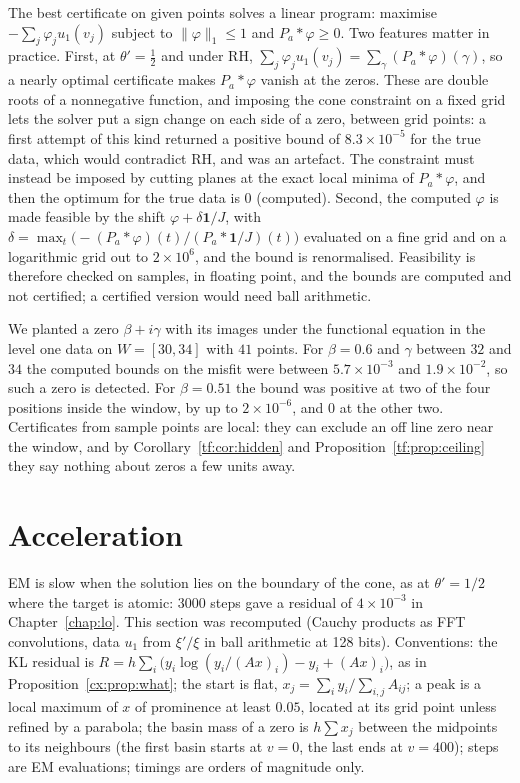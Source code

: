 The best certificate on given points solves a linear program: maximise $-\sum_j\varphi_ju_1(v_j)$ subject to $\|\varphi\|_1\le1$ and $P_a*\varphi\ge0$. Two features matter in practice. First, at $\theta'=\tfrac12$ and under RH, $\sum_j\varphi_ju_1(v_j)=\sum_\gamma(P_a*\varphi)(\gamma)$, so a nearly optimal certificate makes $P_a*\varphi$ vanish at the zeros. These are double roots of a nonnegative function, and imposing the cone constraint on a fixed grid lets the solver put a sign change on each side of a zero, between grid points: a first attempt of this kind returned a positive bound of $8.3\times10^{-5}$ for the true data, which would contradict RH, and was an artefact. The constraint must instead be imposed by cutting planes at the exact local minima of $P_a*\varphi$, and then the optimum for the true data is $0$ (computed). Second, the computed $\varphi$ is made feasible by the shift $\varphi+\delta\mathbf 1/J$, with $\delta=\max_t\bigl(-(P_a*\varphi)(t)/(P_a*\mathbf 1/J)(t)\bigr)$ evaluated on a fine grid and on a logarithmic grid out to $2\times10^6$, and the bound is renormalised. Feasibility is therefore checked on samples, in floating point, and the bounds are computed and not certified; a certified version would need ball arithmetic.

We planted a zero $\beta+i\gamma$ with its images under the functional equation in the level one data on $W=[30,34]$ with $41$ points. For $\beta=0.6$ and $\gamma$ between $32$ and $34$ the computed bounds on the misfit were between $5.7\times10^{-3}$ and $1.9\times10^{-2}$, so such a zero is detected. For $\beta=0.51$ the bound was positive at two of the four positions inside the window, by up to $2\times10^{-6}$, and $0$ at the other two. Certificates from sample points are local: they can exclude an off line zero near the window, and by Corollary~\ref{tf:cor:hidden} and Proposition~\ref{tf:prop:ceiling} they say nothing about zeros a few units away.

\section{Acceleration}\label{cx:sec:accel}

EM is slow when the solution lies on the boundary of the cone, as at $\theta'=1/2$ where the target is atomic: $3000$ steps gave a residual of $4\times10^{-3}$ in Chapter~\ref{chap:lo}. This section was recomputed (Cauchy products as FFT convolutions, data $u_1$ from $\xi'/\xi$ in ball arithmetic at 128 bits). Conventions: the KL residual is $R=h\sum_i\bigl(y_i\log(y_i/(Ax)_i)-y_i+(Ax)_i\bigr)$, as in Proposition~\ref{cx:prop:what}; the start is flat, $x_j=\sum_iy_i/\sum_{i,j}A_{ij}$; a peak is a local maximum of $x$ of prominence at least $0.05$, located at its grid point unless refined by a parabola; the basin mass of a zero is $h\sum x_j$ between the midpoints to its neighbours (the first basin starts at $v=0$, the last ends at $v=400$); steps are EM evaluations; timings are orders of magnitude only.

